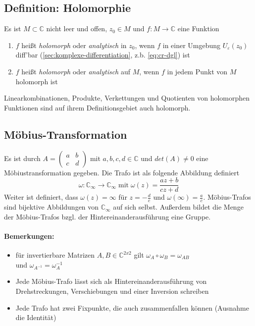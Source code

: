 \subsection{Definition: Holomorphie}
Es ist $M\subset\mathbb{C}$ nicht leer und offen, $z_0\in M $ und $f:M\to\mathbb{C}$ eine Funktion
\begin{enumerate}
    \item $f$ heißt \textit{holomorph} oder \textit{analytisch} in $z_0$, wenn $f$ in einer Umgebung $U_{\varepsilon}(z_0)$ diff'bar (\ref{sec:komplexe-differentiation}, z.b. \eqref{eq:cr-dgl}) ist 
    \item $f$ heißt \textit{holomorph} oder \textit{analytisch} auf $M$, wenn $f$ in jedem Punkt von $M$ holomorph ist
\end{enumerate}

\noindent Linearkombinationen, Produkte, Verkettungen und Quotienten von holomorphen Funktionen sind auf ihrem Definitionsgebiet auch holomorph.


\subsection{Möbius-Transformation}
Es ist durch $A=\left(\begin{smallmatrix}a & b \\ c & d \end{smallmatrix}\right)$ mit $a,b,c,d\in\mathbb{C}$ und $det(A)\neq 0$ eine Möbiustransformation gegeben. Die Trafo ist als folgende Abbildung definiert
\begin{equation*}
    \omega:\mathbb{C}_{\infty}\to\mathbb{C}_{\infty}\; \text{mit} \; \omega(z)=\frac{az+b}{cz+d}
\end{equation*}
Weiter ist definiert, dass $\omega(z)=\infty$ für $z=-\frac{d}{c}$ und $\omega(\infty)=\frac{a}{c}$.
Möbius-Trafos sind bijektive Abbildungen von $\mathbb{C}_{\infty}$ auf sich selbst. Außerdem bildet die Menge der Möbius-Trafos bzgl. der Hintereinanderausführung eine Gruppe.

\paragraph{Bemerkungen:}
\begin{itemize}
    \item für invertierbare Matrizen $A,B\in\mathbb{C}^{2x2}$ gilt $\omega_A \circ \omega_B=\omega_{AB}$ \\und $\omega_{A^{-1}} = \omega_A^{-1}$ 
    \item Jede Möbius-Trafo lässt sich als Hintereinanderausführung von Drehstreckungen, Verschiebungen und einer Inversion schreiben
    \item Jede Trafo hat zwei Fixpunkte, die auch zusammenfallen können (Ausnahme die Identität)
\end{itemize}



